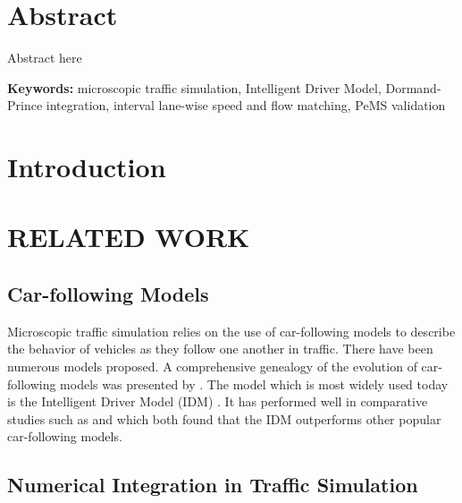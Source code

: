 \documentclass{scspaperproc}
\theoremstyle{scsthe}
\begin{document}
    \maketitle

    \section*{Abstract}
    Abstract here


    \textbf{Keywords:} microscopic traffic simulation, Intelligent Driver Model, Dormand-Prince integration, interval lane-wise speed and flow matching, PeMS validation

    \section{Introduction}
    \label{sec:intro}



    \section{RELATED WORK}
    \label{sec:related}
    \subsection{Car-following Models}

    Microscopic traffic simulation relies on the use of car-following models to describe the behavior of vehicles as they follow one another in traffic.
    There have been numerous models proposed.
    A comprehensive genealogy of the evolution of car-following models was presented by \cite{van2015genealogy}.
    The model which is most widely used today is the Intelligent Driver Model (IDM) \cite{treiber2000congested}.
    It has performed well in comparative studies such as \cite{zhang2021comprehensive} and \cite{pourabdollah2017calibration} which both found that the IDM outperforms other popular car-following models.

    \subsection{Numerical Integration in Traffic Simulation}
\end{document}
